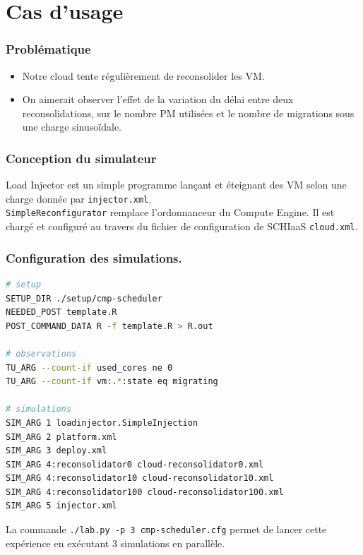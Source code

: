 \documentclass{beamer}
\begin{document}
\section{Cas d'usage}

\begin{frame}
	\frametitle{Problématique}
	\begin{itemize}
		\item Notre cloud tente régulièrement de reconsolider les VM.
		\item On aimerait observer l'effet de la variation du délai entre
			deux reconsolidations, sur le nombre PM utilisées et le
			nombre de migrations sous une charge sinusoïdale.
	\end{itemize}
\end{frame}

\begin{frame}
	\frametitle{Conception du simulateur}
	\resizebox{\textwidth}{!}{}
	Load Injector est un simple programme lançant et éteignant des VM selon
	une charge donnée par \texttt{injector.xml}.\\

	\texttt{SimpleReconfigurator} remplace l'ordonnanceur du Compute Engine.
	Il est chargé et configuré au travers du fichier de configuration de
	SCHIaaS \texttt{cloud.xml}.
\end{frame}

\begin{frame}[fragile]
	\frametitle{Configuration des simulations.}
\begin{lstlisting}[language=bash,basicstyle=\tt\footnotesize,backgroundcolor=\color{gray!10},
morekeywords={SETUP_DIR,TU_ARG,NEEDED_POST,POST_COMMAND_DATA,SIM_ARG},
keywordstyle=\color{red!90},commentstyle=\color{blue!70}]
# setup
SETUP_DIR ./setup/cmp-scheduler
NEEDED_POST template.R
POST_COMMAND_DATA R -f template.R > R.out

# observations
TU_ARG --count-if used_cores ne 0
TU_ARG --count-if vm:.*:state eq migrating

# simulations
SIM_ARG 1 loadinjector.SimpleInjection
SIM_ARG 2 platform.xml 
SIM_ARG 3 deploy.xml
SIM_ARG 4:reconsolidator0 cloud-reconsolidator0.xml
SIM_ARG 4:reconsolidator10 cloud-reconsolidator10.xml 
SIM_ARG 4:reconsolidator100 cloud-reconsolidator100.xml
SIM_ARG 5 injector.xml
\end{lstlisting}
La commande \texttt{./lab.py -p 3 cmp-scheduler.cfg} permet de lancer cette
expérience en exécutant 3 simulations en parallèle.
\end{frame}
\end{document}
